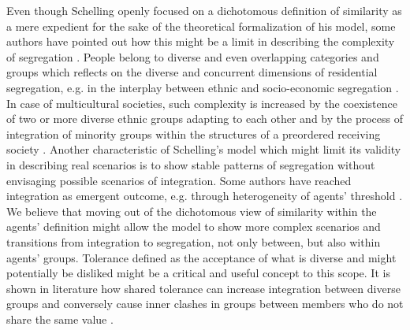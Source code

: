 \documentclass{ws-acs}
\begin{document}
Even though Schelling openly focused on a dichotomous definition of similarity as a mere expedient for the sake of the theoretical formalization of his model, some authors have pointed out how this might be a limit in describing the complexity of segregation  \cite{clark2008}. People belong to diverse and even overlapping categories and groups \cite{roccas2002} which reflects on the diverse and concurrent dimensions of residential segregation, e.g. in the interplay between ethnic and socio-economic segregation  \cite{ibraimovic2014, pais2017}. In case of multicultural societies, such complexity is increased by the coexistence of two or more diverse ethnic groups adapting to each other \cite{redfield36} and by the process of integration of minority groups within the structures of a preordered receiving society \cite{martone2014}. Another characteristic of Schelling's model which might limit its validity in describing real scenarios is to show stable patterns of segregation without envisaging possible scenarios of integration. Some authors have reached integration as emergent outcome, e.g. through heterogeneity of agents' threshold \cite{hatna2015}. We believe that moving out of the dichotomous view of similarity within the agents' definition might allow the model to show more complex scenarios and transitions from integration to segregation, not only between, but also within agents' groups. Tolerance defined as the acceptance of what is diverse and might potentially be disliked \cite{marjoka2014} might be a critical and useful concept to this scope. It is shown in literature how shared tolerance can increase integration between diverse groups \cite{brewer2005} and conversely cause inner clashes in groups between members who do not share the same value \cite{verkuyten2010}.
\end{document}
